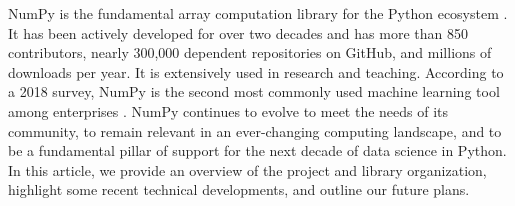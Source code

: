 



NumPy is the fundamental array computation library for the Python ecosystem
\cite{dubois2007guest,oliphant2007python,millman2011python,perez2011python}.
It has been actively developed for over two decades and has
more than 850 contributors, nearly 300,000 dependent repositories
on GitHub, and millions of downloads per year.
It is extensively used in research and teaching.
According to a 2018 survey, NumPy is the second most commonly used machine
learning tool among enterprises \cite{451report2018}.
NumPy continues to evolve to meet the needs of its community, to
remain relevant in an ever-changing computing landscape, and to be a
fundamental pillar of support for the next decade of data science in
Python.
In this article, we provide an overview of the project and library
organization,  highlight some recent technical developments, and
outline our future plans.
